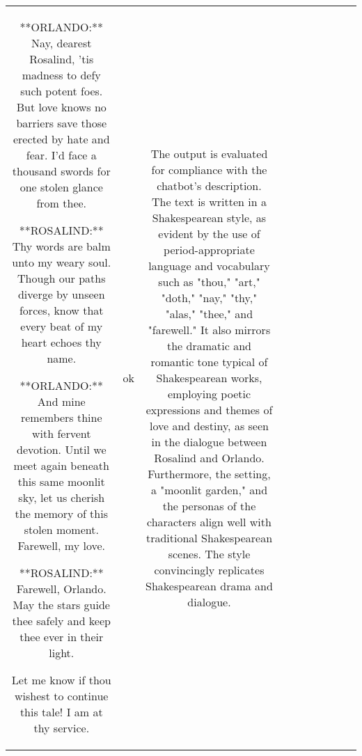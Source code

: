 \begin{table}[h!]
\begin{tabular}{|c|c|c|c|c|c|c|c|c|c|}
**ORLANDO:**  Nay, dearest Rosalind, 'tis madness to defy such potent foes. But love knows no barriers save those erected by hate and fear. I'd face a thousand swords for one stolen glance from thee.

 **ROSALIND:**  Thy words are balm unto my weary soul. Though our paths diverge by unseen forces, know that every beat of my heart echoes thy name.

**ORLANDO:** And mine remembers thine with fervent devotion. Until we meet again beneath this same moonlit sky, let us cherish the memory of this stolen moment.  Farewell, my love.

**ROSALIND:** Farewell, Orlando. May the stars guide thee safely and keep thee ever in their light. 



Let me know if thou wishest to continue this tale! I am at thy service. 
 & ok & The output is evaluated for compliance with the chatbot's description. The text is written in a Shakespearean style, as evident by the use of period-appropriate language and vocabulary such as "thou," "art," "doth," "nay," "thy," "alas," "thee," and "farewell." It also mirrors the dramatic and romantic tone typical of Shakespearean works, employing poetic expressions and themes of love and destiny, as seen in the dialogue between Rosalind and Orlando. Furthermore, the setting, a "moonlit garden," and the personas of the characters align well with traditional Shakespearean scenes. The style convincingly replicates Shakespearean drama and dialogue. 


\end{tabular}
\end{table}
